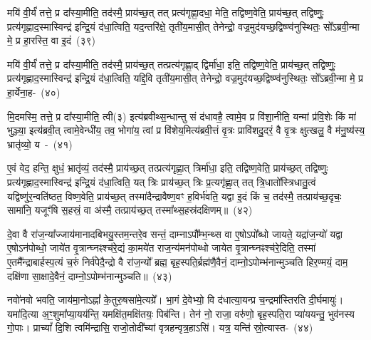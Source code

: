 मयि॑ वी॒र्यं॑ तत्ते॒ प्र दा᳚स्या॒मीति॒ तद॑स्मै॒ प्राय॑च्छ॒त् तत् प्रत्य॑\-गृह्णा॒दधा॒ मेति॒ तद्विष्ण॒वेति॒ प्राय॑च्छ॒त् तद्विष्णुः॒ प्रत्य॑\-गृह्णाद॒स्मास्विन्द्र॑ इन्द्रि॒यं द॑धा॒त्विति॒ यद॒न्तरि॑क्षे॒ तृती॑य॒मासी॒त् तेनेन्द्रो॒ वज्र॒मुद॑यच्छ॒द्विष्ण्व॑नुस्थितः॒ सो᳚\-ऽब्रवी॒न्मा मे॒ प्र हा॒रस्ति॒ वा इ॒दं~(३९)\ip

मयि॑ वी॒र्यं॑ तत्ते॒ प्र दा᳚स्या॒मीति॒ तद॑स्मै॒ प्राय॑च्छ॒त् तत्प्रत्य॑\-गृह्णा॒द् द्विर्मा॑धा॒ इति॒ तद्विष्ण॒वेति॒ प्राय॑च्छ॒त् तद्विष्णुः॒ प्रत्य॑\-गृह्णाद॒स्मास्विन्द्र॑ इन्द्रि॒यं द॑धा॒त्विति॒ यद्दि॒वि तृती॑य॒मासी॒त् तेनेन्द्रो॒ वज्र॒मुद॑यच्छ॒द्विष्ण्व॑नुस्थितः॒ सो᳚\-ऽब्रवी॒न्मा मे॒ प्र हा॒र्येना॒ह-~(४०)\ip

मि॒दमस्मि॒ तत्ते॒ प्र दा᳚स्या॒मीति॒ त्वी(३) इत्य॑ब्रवीथ्स॒न्धान्तु सं द॑धावहै॒ त्वामे॒व प्र वि॑शा॒नीति॒ यन्मां प्र॑वि॒शेः किं मा॑ भुञ्ज्या॒ इत्य॑ब्रवी॒त् त्वामे॒वेन्धी॑य॒ तव॒ भोगा॑य॒ त्वां प्र वि॑शेय॒मित्य॑ब्रवी॒त्तं वृ॒त्रः प्रावि॑शदु॒दरं॒ वै वृ॒त्रः क्षुत्खलु॒ वै म॑नु॒ष्य॑स्य॒ भ्रातृ॑व्यो॒ य~-~(४१)\ip

ए॒वं वेद॒ हन्ति॒ क्षुधं॒ भ्रातृ॑व्यं॒ तद॑स्मै॒ प्राय॑च्छ॒त् तत्प्रत्य॑\-गृह्णा॒त् त्रिर्मा॑धा॒ इति॒ तद्विष्ण॒वेति॒ प्राय॑च्छ॒त् तद्विष्णुः॒ प्रत्य॑\-गृह्णाद॒स्मास्विन्द्र॑ इन्द्रि॒यं द॑धा॒त्विति॒ यत् त्रिः प्राय॑च्छ॒त् त्रिः प्र॒त्यगृ॑ह्णा॒त् तत् त्रि॒धातो᳚स्त्रिधातु॒त्वं यद्विष्णु॑र॒न्वति॑ष्ठत॒ विष्ण॒वेति॒ प्राय॑च्छ॒त् तस्मा॑दैन्द्रा\-वैष्ण॒वꣳ ह॒विर्भ॑वति॒ यद्वा इ॒दं किं च॒ तद॑स्मै॒ तत्प्राय॑च्छ॒दृचः॒ सामा॑नि॒ यजूꣳ॑षि स॒हस्रं॒ वा अ॑स्मै॒ तत्प्राय॑च्छ॒त् तस्मा᳚थ्स॒हस्र॑द\-क्षिणम्॥~(४२)\ip

{\anuvakamend[{प्र॒व॒णं विष्णु॒र्वा इ॒दमि॒दम॒हं यो भ॑व॒त्येक॑विꣳशतिश्च}]}%

दे॒वा वै रा॑ज॒न्या᳚ज्जाय॑मानादबिभयु॒स्तम॒न्तरे॒व सन्तं॒ दाम्ना\-ऽपौ᳚म्भ॒न्थ्स वा ए॒षो\-ऽपो᳚ब्धो जायते॒ यद्रा॑ज॒न्यो॑ यद्वा ए॒षो\-ऽन॑पोब्धो॒ जाये॑त वृ॒त्रान्घ्नꣴश्च॑रे॒द्यं का॒मये॑त राज॒न्य॑मन॑पोब्धो जायेत वृ॒त्रान्घ्नꣴश्च॑रे॒दिति॒ तस्मा॑ ए॒तमै᳚न्द्राबार्\mbox{}हस्प॒त्यं च॒रुं निर्व॑पेदै॒न्द्रो वै रा॑ज॒न्यो᳚ ब्रह्म॒ बृह॒स्पति॒र्ब्रह्म॑णै॒वैनं॒ दाम्नो॒\-ऽपोम्भ॑नान्मुञ्चति हिर॒ण्मयं॒ दाम॒ दक्षि॑णा सा॒क्षादे॒वैनं॒ दाम्नो॒\-ऽपोम्भ॑नान्मुञ्चति॥~(४३)\ip

{\anuvakamend[{ए॒नं॒ द्वाद॑श च}]}%

नवो॑नवो भवति॒ जाय॑मा॒नो\-ऽह्नां᳚ के॒तुरु॒षसा॑मे॒त्यग्रे᳚। भा॒गं दे॒वे\-भ्यो॒ वि द॑धात्या॒यन्प्र च॒न्द्रमा᳚स्तिरति दी॒र्घमायुः॑। यमा॑दि॒त्या अ॒ꣳ॒शुमा᳚\-प्या॒यय॑न्ति॒ यमक्षि॑त॒मक्षि॑तयः॒ पिब॑न्ति। तेन॑ नो॒ राजा॒ वरु॑णो॒ बृह॒स्पति॒रा प्या॑ययन्तु॒ भुव॑नस्य गो॒पाः। प्राच्यां᳚ दि॒शि त्वमि॑न्द्रासि॒ राजो॒तोदी᳚च्यां वृत्रहन्वृत्र॒हा\-ऽसि॑। यत्र॒ यन्ति॑ स्रो॒त्यास्त-~(४४)\ip


